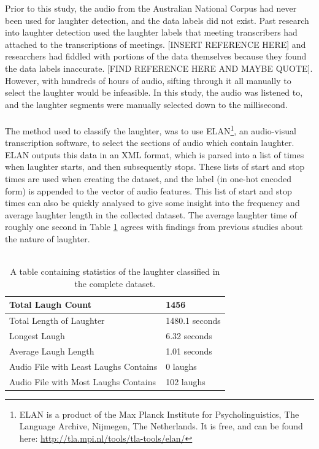 \documentclass[a4paper,11pt,notitlepage]{article}
\begin{document}
Prior to this study, the audio from the Australian National Corpus had never been used for laughter detection, and the data labels did not exist. Past research into laughter detection used the laughter labels that meeting transcribers had attached to the transcriptions of meetings. [INSERT REFERENCE HERE] and researchers had fiddled with portions of the data themselves because they found the data labels inaccurate. [FIND REFERENCE HERE AND MAYBE QUOTE]. However, with hundreds of hours of audio, sifting through it all manually to select the laughter would be infeasible. In this study, the audio was listened to, and the laughter segments were manually selected down to the millisecond.\\
\\
The method used to classify the laughter, was to use ELAN\footnote{ELAN is a product of the Max Planck Institute for Psycholinguistics, The Language Archive, Nijmegen, The Netherlands. It is free, and can be found here: \url{http://tla.mpi.nl/tools/tla-tools/elan/}}\cite{sloetjes2008annotation}, an audio-visual transcription software, to select the sections of audio which contain laughter. ELAN outputs this data in an XML format, which is parsed into a list of times when laughter starts, and then subsequently stops. These lists of start and stop times are used when creating the dataset, and the label (in one-hot encoded form) is appended to the vector of audio features. This list of start and stop times can also be quickly analysed to give some insight into the frequency and average laughter length in the collected dataset. The average laughter time of roughly one second in Table \ref{laughter_stats_table} agrees with findings from previous studies about the nature of laughter.\cite{bachorowski2001acoustic}\\
\\ 
\begin{table}[]
\centering
\begin{tabular}{|l|l|}
\hline
Total Laugh Count                     & 1456           \\ \hline
Total Length of Laughter              & 1480.1 seconds \\ \hline
Longest Laugh                         & 6.32 seconds   \\ \hline
Average Laugh Length                  & 1.01 seconds   \\ \hline
Audio File with Least Laughs Contains & 0 laughs       \\ \hline
Audio File with Most Laughs Contains  & 102 laughs     \\ \hline
\end{tabular}
\caption{A table containing statistics of the laughter classified in the complete dataset.}
\label{laughter_stats_table}
\end{table}
\end{document}
